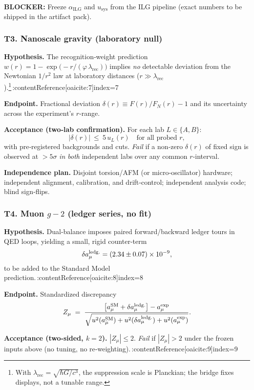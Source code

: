 \documentclass[11pt]{article}
\begin{document}
\textbf{BLOCKER:} Freeze $\alpha_{\mathrm{ILG}}$ and $u_{\mathrm{sys}}$ from the ILG pipeline (exact numbers to be shipped in the artifact pack).

\subsubsection*{T3. Nanoscale gravity (laboratory null)}
\textbf{Hypothesis.} The recognition‑weight prediction
$w(r)=1-\exp\!\bigl(-r/(\varphi\,\lambda_{\mathrm{rec}})\bigr)$ implies \emph{no} detectable deviation from the Newtonian $1/r^{2}$ law at laboratory distances ($r\gg\lambda_{\mathrm{rec}}$).\footnote{With $\lambda_{\mathrm{rec}}=\sqrt{\hbar G/c^{3}}$, the suppression scale is Planckian; the bridge fixes displays, not a tunable range.}\,:contentReference[oaicite:7]{index=7}

\textbf{Endpoint.} Fractional deviation $\delta(r)\equiv F(r)/F_{N}(r)-1$ and its uncertainty across the experiment’s $r$‑range.

\textbf{Acceptance (two‑lab confirmation).} For each lab $L\in\{A,B\}$:
\[
|\delta(r)|\ \le\ 5\,u_{L}(r)\quad\text{for all probed }r,
\]
with pre‑registered backgrounds and cuts. \emph{Fail} if a non‑zero $\delta(r)$ of fixed sign is observed at $>5\sigma$ \emph{in both} independent labs over any common $r$‑interval.

\textbf{Independence plan.} Disjoint torsion/AFM (or micro‑oscillator) hardware; independent alignment, calibration, and drift‑control; independent analysis code; blind sign‑flips.

\subsubsection*{T4. Muon $g\!-\!2$ (ledger series, no fit)}
\textbf{Hypothesis.} Dual‑balance imposes paired forward/backward ledger tours in QED loops, yielding a small, rigid counter‑term
\[
\delta a_{\mu}^{\rm ledg.}=(2.34\pm0.07)\times10^{-9},
\]
to be added to the Standard Model prediction.\,:contentReference[oaicite:8]{index=8}

\textbf{Endpoint.} Standardized discrepancy
\[
Z_{\mu}\;=\;\frac{\bigl[a_{\mu}^{\rm SM}+\delta a_{\mu}^{\rm ledg.}\bigr]-a_{\mu}^{\rm exp}}
                    {\sqrt{u^{2}(a_{\mu}^{\rm SM})+u^{2}(\delta a_{\mu}^{\rm ledg.})+u^{2}(a_{\mu}^{\rm exp})}}.
\]

\textbf{Acceptance (two‑sided, $k=2$).} $|Z_{\mu}|\le 2$. \emph{Fail} if $|Z_{\mu}|>2$ under the frozen inputs above (no tuning, no re‑weighting).\,:contentReference[oaicite:9]{index=9}
\end{document}
